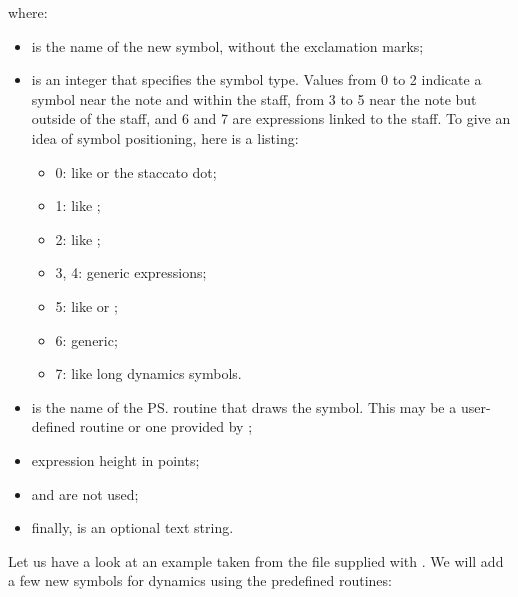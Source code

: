 \documentclass[a4paper,12pt]{book}
\begin{document}
\medskip

where:

\begin{itemize}
  
  \item {} is the name of the new symbol, without the
  exclamation marks;
  
  \item {} is an integer that specifies the symbol type.
  Values from 0 to 2 indicate a symbol near the note and within the
  staff, from 3 to 5 near the note but outside of the staff, and 6 and
  7 are expressions linked to the staff. To give an idea of symbol
  positioning, here is a listing:
  
  \begin{itemize}
  
    \item 0: like  or the staccato dot;
    
    \item 1: like ;
    
    \item 2: like ;
    
    \item 3, 4: generic expressions;
    
    \item 5: like  or ;
    
    \item 6: generic;
    
    \item 7: like long dynamics symbols.
    
  \end{itemize}

  \item {} is the name of the \ps{} routine that draws the
  symbol. This may be a user-defined routine or one provided by
  \abcm{};

  \item {} expression height in points;

  \item {} and  are not used;

  \item finally,  is an optional text string.

\end{itemize}

Let us have a look at an example taken from the file 
supplied with \abcm{}. We will add a few new symbols for dynamics
using the predefined  routines:
\end{document}
